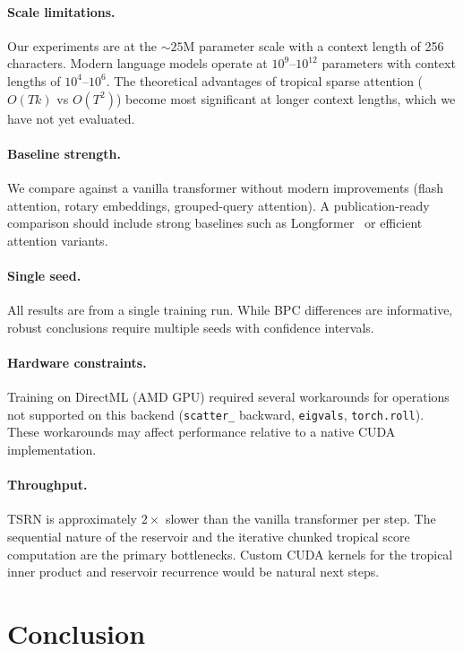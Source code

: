 \documentclass[11pt,a4paper]{article}
\begin{document}
\paragraph{Scale limitations.}
Our experiments are at the $\sim\!25$M parameter scale with a
context length of 256 characters.  Modern language models operate at
$10^9$--$10^{12}$ parameters with context lengths of $10^4$--$10^6$.
The theoretical advantages of tropical sparse attention ($O(Tk)$ vs
$O(T^2)$) become most significant at longer context lengths, which
we have not yet evaluated.

\paragraph{Baseline strength.}
We compare against a vanilla transformer without modern improvements
(flash attention, rotary embeddings, grouped-query attention).  A
publication-ready comparison should include strong baselines such as
Longformer~\citep{beltagy2020longformer} or efficient attention
variants.

\paragraph{Single seed.}
All results are from a single training run.  While BPC differences
are informative, robust conclusions require multiple seeds with
confidence intervals.

\paragraph{Hardware constraints.}
Training on DirectML (AMD GPU) required several workarounds for
operations not supported on this backend (\texttt{scatter\_} backward,
\texttt{eigvals}, \texttt{torch.roll}).  These workarounds may affect
performance relative to a native CUDA implementation.

\paragraph{Throughput.}
TSRN is approximately $2\times$ slower than the vanilla transformer
per step.  The sequential nature of the reservoir and the iterative
chunked tropical score computation are the primary bottlenecks.
Custom CUDA kernels for the tropical inner product and reservoir
recurrence would be natural next steps.


\section{Conclusion}
\label{sec:conclusion}
\end{document}

